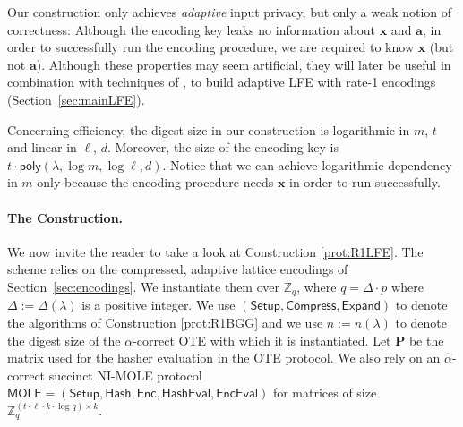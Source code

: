 \documentclass{theoretics}
\newcommand{\MOLE}{\mathsf{MOLE}}
\newcommand{\Z}{\mathbb{Z}}
\newcommand{\poly}{\mathsf{poly}}
\renewcommand{\sec}{\ensuremath{\lambda}}
\newcommand{\Compress}{\mathsf{Compress}}
\newcommand{\algofont}[1]{\ensuremath{\mathsf{#1}}}
\newcommand{\Enc}{{\algofont{Enc}}}
\newcommand{\Setup}{{\algofont{Setup}}}
\newcommand{\Eval}{\algofont{Eval}\xspace}
\newcommand{\Hash}{{\algofont{Hash}}}
\newcommand{\Expand}{\algofont{Expand}}
\newcommand{\secref}[1]{Section~\ref{sec:#1}}
\begin{document}
Our construction only achieves \emph{adaptive} input privacy, but only a weak notion of correctness: Although the encoding key leaks no information about $\mathbf{x}$ and $\mathbf{a}$, in order to successfully run the encoding procedure, we are required to know $\mathbf{x}$ (but not $\mathbf{a}$). Although these properties may seem artificial, they will later be useful in combination with techniques of \cite{TCC:BTVW17}, to build adaptive LFE with rate-1 encodings (Section~\ref{sec:mainLFE}).

Concerning efficiency, the digest size in our construction is logarithmic in $m$, $t$ and linear in $\ell$, $d$. Moreover, the size of the encoding key is $t\cdot \poly(\sec, \log m, \log \ell, d)$. Notice that we can achieve logarithmic dependency in $m$ only because the encoding procedure needs $\mathbf{x}$ in order to run successfully. 

\paragraph{The Construction.} We now invite the reader to take a look at Construction \ref{prot:R1LFE}. The scheme relies on the compressed, adaptive lattice encodings of \secref{encodings}. We instantiate them over $\Z_q$, where $q=\Delta\cdot p$ where $\Delta:=\Delta(\sec)$ is a positive integer. We use $(\Setup, \Compress, \Expand)$ to denote the algorithms of Construction \ref{prot:R1BGG} and we use $n:=n(\sec)$ to denote the digest size of the $\alpha$-correct OTE with which it is instantiated. Let $\mathbf{P}$ be the matrix used for the hasher evaluation in the OTE protocol. We also rely on an $\hat{\alpha}$-correct succinct NI-MOLE protocol $\MOLE=(\Setup, \Hash, \Enc, \Hash\Eval, \Enc\Eval)$ for matrices of size $\Z_q^{(t\cdot \ell\cdot k\cdot \log q)\times k}$.
\end{document}
